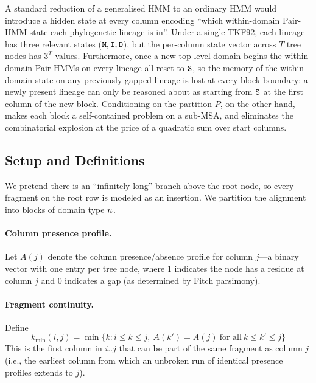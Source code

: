 A standard reduction of a generalised HMM to an ordinary HMM would
introduce a hidden state at every column encoding ``which within-domain
Pair-HMM state each phylogenetic lineage is in''. Under a single TKF92,
each lineage has three relevant states (${\tt M}, {\tt I}, {\tt D}$), but the
per-column state vector across $T$ tree nodes has $3^T$ values.
Furthermore, once a new top-level domain begins the within-domain Pair
HMMs on every lineage all reset to ${\tt S}$, so the memory of the within-domain
state on any previously gapped lineage is lost at every block boundary:
a newly present lineage can only be reasoned about as starting from
${\tt S}$ at the first column of the new block. Conditioning on the
partition $P$, on the other hand, makes each block a self-contained
problem on a sub-MSA, and eliminates the combinatorial explosion
at the price of a quadratic sum over start columns.

\subsection{Setup and Definitions}
\label{sec:partition-setup}

We pretend there is an ``infinitely long'' branch above the root node, so
every fragment on the root row is modeled as an insertion. We partition
the alignment into blocks of domain type $n$.

\paragraph{Column presence profile.}
Let $A(j)$ denote the column presence/absence profile for column $j$---a
binary vector with one entry per tree node, where $1$ indicates the node
has a residue at column $j$ and $0$ indicates a gap (as determined by
Fitch parsimony).

\paragraph{Fragment continuity.}
Define
\[
k_{\min}(i,j) = \min\{ k : i \leq k \leq j,\ A(k') = A(j)\ \text{for all}\ k \leq k' \leq j \}
\]
This is the first column in $i..j$ that can be part of the same fragment
as column $j$ (i.e., the earliest column from which an unbroken run of
identical presence profiles extends to $j$).

